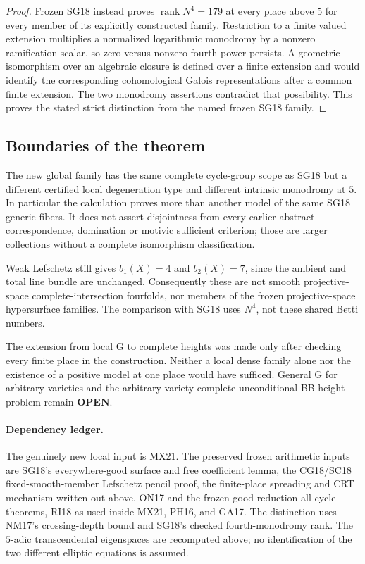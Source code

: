 \begin{proof}
Frozen SG18 instead proves $\operatorname{rank}N^4=179$ at every
place above $5$ for every member of its explicitly constructed
family.  Restriction to a finite valued extension multiplies a
normalized logarithmic monodromy by a nonzero ramification scalar,
so zero versus nonzero fourth power persists.  A geometric
isomorphism over an algebraic closure is defined over a finite
extension and would identify the corresponding cohomological
Galois representations after a common finite extension.  The two
monodromy assertions contradict that possibility.  This proves
the stated strict distinction from the named frozen SG18 family.
\end{proof}

\subsection{Boundaries of the theorem}

The new global family has the same complete cycle-group scope as
SG18 but a different certified local degeneration type and different
intrinsic monodromy at $5$.  In particular the calculation proves
more than another model of the same SG18 generic fibers.  It does
not assert disjointness from every earlier abstract correspondence,
domination or motivic sufficient criterion; those are larger
collections without a complete isomorphism classification.

Weak Lefschetz still gives $b_1(X)=4$ and $b_2(X)=7$, since the
ambient and total line bundle are unchanged.  Consequently these
are not smooth projective-space complete-intersection fourfolds,
nor members of the frozen projective-space hypersurface families.
The comparison with SG18 uses $N^4$, not these shared Betti numbers.

The extension from local G to complete heights was made only after
checking every finite place in the construction.  Neither a local
dense family alone nor the existence of a positive model at one
place would have sufficed.  General G for arbitrary varieties and
the arbitrary-variety complete unconditional BB height problem
remain \textbf{OPEN}.

\paragraph{Dependency ledger.}
The genuinely new local input is MX21.  The preserved frozen
arithmetic inputs are SG18's everywhere-good surface and free
coefficient lemma, the CG18/SC18 fixed-smooth-member Lefschetz
pencil proof, the finite-place spreading and CRT mechanism written
out above, ON17 and the frozen good-reduction all-cycle theorems,
RI18 as used inside MX21, PH16, and GA17.  The distinction uses
NM17's crossing-depth bound and SG18's checked fourth-monodromy
rank.  The $5$-adic transcendental eigenspaces are recomputed above;
no identification of the two different elliptic equations is
assumed.
